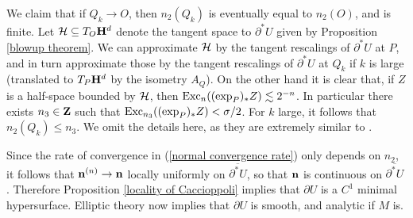 We claim that if $Q_k \to O$, then $n_2(Q_k)$ is eventually equal to $n_2(O)$, and is finite.
Let $\mathcal H \subseteq T_O\mathbf H^d$ denote the tangent space to $\partial^* U$ given by Proposition \ref{blowup theorem}.
We can approximate $\mathcal H$ by the tangent rescalings of $\partial^* U$ at $P$, and in turn approximate those by the tangent rescalings of $\partial^* U$ at $Q_k$ if $k$ is large (translated to $T_P \mathbf H^d$ by the isometry $A_Q$).
On the other hand it is clear that, if $Z$ is a half-space bounded by $\mathcal H$, then $\operatorname{Exc}_n((\exp_P)_* Z) \lesssim 2^{-n}$.
In particular there exists $n_3 \in \mathbf{Z}$ such that $\operatorname{Exc}_{n_3}((\exp_P)_* Z) < \sigma/2$.
For $k$ large, it follows that $n_2(Q_k) \leq n_3$.
We omit the details here, as they are extremely similar to \cite[Teorema 4]{Miranda67}.

Since the rate of convergence in (\ref{normal convergence rate}) only depends on $n_2$, it follows that $\mathbf n^{(n)} \to \mathbf n$ locally uniformly on $\overline{\partial^* U}$, so that $\mathbf n$ is continuous on $\overline{\partial^* U}$.
Therefore Proposition \ref{locality of Caccioppoli} implies that $\partial U$ is a $C^1$ minimal hypersurface.
Elliptic theory \cite{morrey2009multiple} now implies that $\partial U$ is smooth, and analytic if $M$ is.